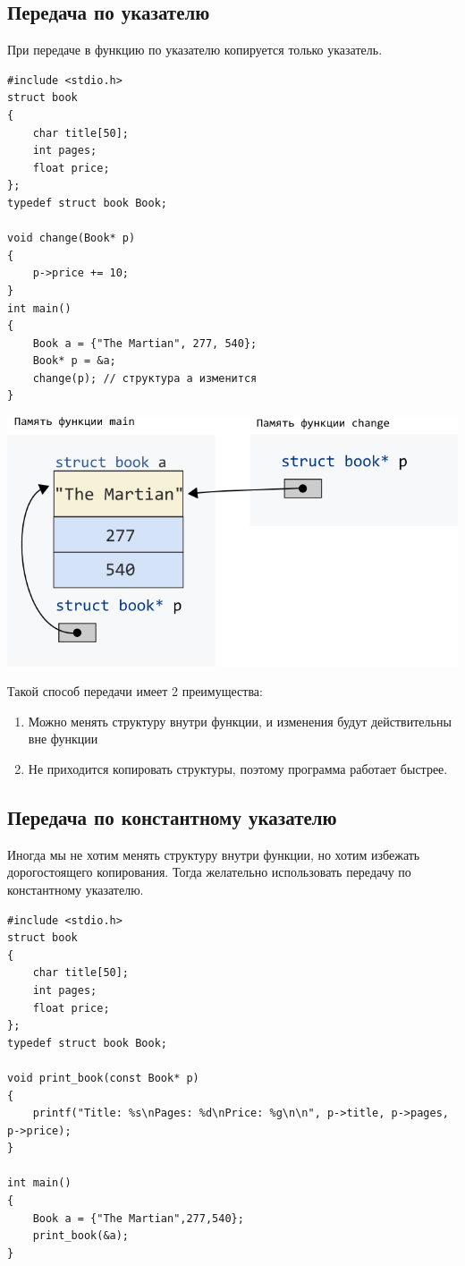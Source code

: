 \documentclass[10pt]{article}
\begin{document}
\subsection*{Передача по указателю}
При передаче в функцию по указателю копируется только указатель.
\begin{multicols}{2}
\begin{lstlisting}
#include <stdio.h>
struct book 
{
    char title[50];
    int pages;
    float price;
};
typedef struct book Book;

void change(Book* p) 
{
    p->price += 10;
}
int main() 
{
    Book a = {"The Martian", 277, 540};
    Book* p = &a;
    change(p); // структура a изменится
}
\end{lstlisting}
\vfill\null
\columnbreak
\begin{center}
\includegraphics[scale=0.5]{../images/structpassbypointer.png}
\end{center}
\end{multicols}

\noindent Такой способ передачи имеет 2 преимущества:
\begin{enumerate}
\item Можно менять структуру внутри функции, и изменения будут действительны вне функции
\item Не приходится копировать структуры, поэтому программа работает быстрее.
\end{enumerate}

\subsection*{Передача по константному указателю}
Иногда мы не хотим менять структуру внутри функции, но хотим избежать дорогостоящего копирования. Тогда желательно использовать передачу по константному указателю.
\begin{lstlisting}
#include <stdio.h>
struct book 
{
    char title[50];
    int pages;
    float price;
};
typedef struct book Book;

void print_book(const Book* p) 
{
    printf("Title: %s\nPages: %d\nPrice: %g\n\n", p->title, p->pages, p->price);
}

int main() 
{
    Book a = {"The Martian",277,540};
    print_book(&a);
}
\end{lstlisting}
\end{document}

